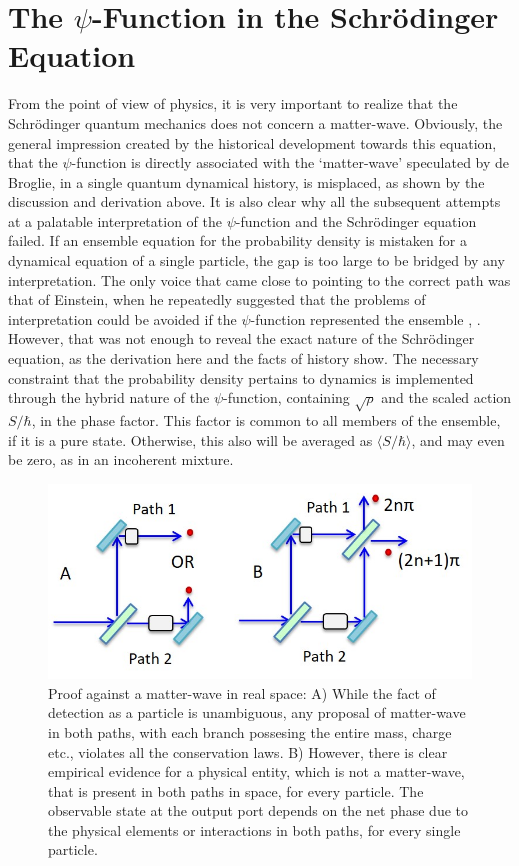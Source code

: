 \section{The $\psi$-Function in the Schr\"{o}dinger\\ Equation}\label{c14-sec3}

From the point of view of physics, it is very important to realize that the Schr\"{o}dinger
quantum mechanics does not concern a matter-wave. 
Obviously, the general impression created by the historical development towards
this equation, that the $\psi$-function is directly associated with the `matter-wave' 
speculated by de Broglie, in a single quantum dynamical history, is misplaced, as shown by the discussion and
derivation above. It is also clear why all the subsequent attempts at a palatable interpretation 
of the $\psi$-function and the Schr\"{o}dinger equation failed. If an ensemble equation for the probability
density is mistaken for a dynamical equation of a single particle, the gap is too large to be
bridged by any interpretation. The only voice that came close to pointing to the correct path
was that of Einstein, when he repeatedly suggested that the problems of interpretation could be
avoided if the $\psi$-function represented the ensemble \cite{chap14-key3}, \cite{chap14-key4}. However, that was not 
enough to reveal the exact nature of the Schr\"{o}dinger equation, as
the derivation here and the facts of history show. The necessary constraint that the probability density pertains to
dynamics is implemented through the hybrid nature of the $\psi$-function, containing $\sqrt{\rho}$ and
the scaled action $S/\hbar$, in the phase factor. This factor is common to all members
of the ensemble, if it is a pure state. Otherwise, this also will be averaged as $\langle S/\hbar\rangle$, and
may even be zero, as in an incoherent mixture.

\begin{figure}[t]
\centering
\includegraphics[scale=0.8]{src/images/chap27/1.jpg}
\caption{Proof against a matter-wave in real space: A) While the fact of detection as a particle is
unambiguous, any proposal of matter-wave in both paths, with each branch possesing the entire
mass, charge etc., violates all the conservation laws. B) However, there is clear empirical evidence for
a physical entity, which is not a matter-wave, that is present in both paths in space, for every
particle. The observable state at the output port depends on the net phase due to the physical elements or interactions  
in both paths, for every single particle.}\label{ch14-fig1}
\end{figure}

